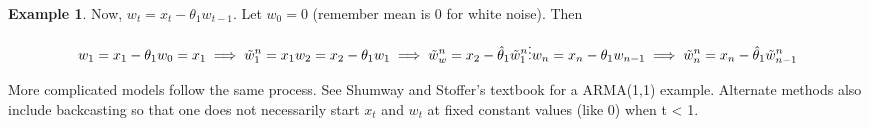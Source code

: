 \documentclass[
]{book}
\theoremstyle{definition}
\theoremstyle{definition}
\newtheorem{example}{Example}[chapter]
\theoremstyle{definition}
\theoremstyle{definition}
\theoremstyle{remark}
\begin{document}
\begin{example}
Now, \(w_t = x_t - \theta_1w_{t-1}\). Let \(w_0 = 0\) (remember mean is 0 for white noise). Then

\[w_1 = x_1 - \theta_1w_0 = x_1     \implies   \tilde w_1^n= x_1\\
w_2 = x_2 - \theta_1w_1   \implies \tilde w^n_w=x_2-\hat \theta_1\tilde w_1^n\\   
\vdots\\
w_n = x_n - \theta_1w_{n-1}  \implies  \tilde w_n^n=x_n-\hat \theta_1\tilde w^n_{n-1}\]

More complicated models follow the same process. See Shumway and Stoffer's textbook for a ARMA(1,1) example. Alternate methods also include backcasting so that one does not necessarily start \(x_t\) and \(w_t\) at fixed constant values (like 0) when t \textless{} 1.
\end{example}
\end{document}
